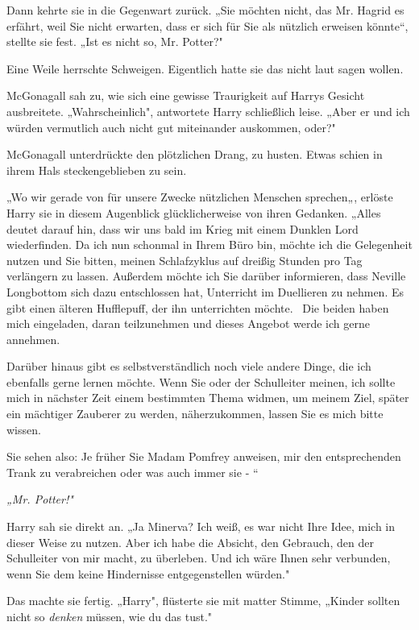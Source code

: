 {Dann kehrte sie in die Gegenwart zurück. „Sie möchten nicht, das Mr. Hagrid es erfährt, weil Sie nicht erwarten, dass er sich für Sie als nützlich erweisen könnte“, stellte sie fest. „Ist es nicht so, Mr. Potter?"

Eine Weile herrschte Schweigen. Eigentlich hatte sie das nicht laut sagen wollen.

McGonagall sah zu, wie sich eine gewisse Traurigkeit auf Harrys Gesicht ausbreitete. „Wahrscheinlich", antwortete Harry schließlich leise. „Aber er und ich würden vermutlich auch nicht gut miteinander auskommen, oder?"

McGonagall unterdrückte den plötzlichen Drang, zu husten. Etwas schien in ihrem Hals steckengeblieben zu sein.

„Wo wir gerade von für unsere Zwecke nützlichen Menschen sprechen„, erlöste Harry sie in diesem Augenblick glücklicherweise von ihren Gedanken. „Alles deutet darauf hin, dass wir uns bald im Krieg mit einem Dunklen Lord wiederfinden. Da ich nun schonmal in Ihrem Büro bin, möchte ich die Gelegenheit nutzen und Sie bitten, meinen Schlafzyklus auf dreißig Stunden pro Tag verlängern zu lassen. Außerdem möchte ich Sie darüber informieren, dass Neville Longbottom sich dazu entschlossen hat, Unterricht im Duellieren zu nehmen. Es gibt einen älteren Hufflepuff, der ihn unterrichten möchte. ~Die beiden haben mich eingeladen, daran teilzunehmen und dieses Angebot werde ich gerne annehmen.

Darüber hinaus gibt es selbstverständlich noch viele andere Dinge, die ich ebenfalls gerne lernen möchte. Wenn Sie oder der Schulleiter meinen, ich sollte mich in nächster Zeit einem bestimmten Thema widmen, um meinem Ziel, später ein mächtiger Zauberer zu werden, näherzukommen, lassen Sie es mich bitte wissen.

Sie sehen also: Je früher Sie Madam Pomfrey anweisen, mir den entsprechenden Trank zu verabreichen oder was auch immer sie - “

\emph{„Mr. Potter!"}

Harry sah sie direkt an. „Ja Minerva? Ich weiß, es war nicht Ihre Idee, mich in dieser Weise zu nutzen. Aber ich habe die Absicht, den Gebrauch, den der Schulleiter von mir macht, zu überleben. Und ich wäre Ihnen sehr verbunden, wenn Sie dem keine Hindernisse entgegenstellen würden."

Das machte sie fertig. „Harry", flüsterte sie mit matter Stimme, „Kinder sollten nicht so \emph{denken} müssen, wie du das tust."

}
